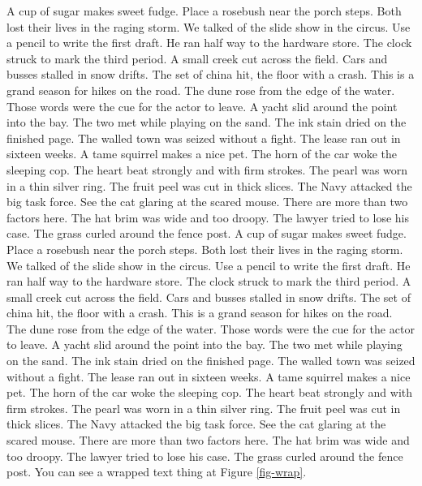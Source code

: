 \documentclass[
  letterpaper,
  DIV=11,
  numbers=noendperiod]{scrartcl}
\begin{document}
A cup of sugar makes sweet fudge. Place a rosebush near the porch steps.
Both lost their lives in the raging storm. We talked of the slide show
in the circus. Use a pencil to write the first draft. He ran half way to
the hardware store. The clock struck to mark the third period. A small
creek cut across the field. Cars and busses stalled in snow drifts. The
set of china hit, the floor with a crash. This is a grand season for
hikes on the road. The dune rose from the edge of the water. Those words
were the cue for the actor to leave. A yacht slid around the point into
the bay. The two met while playing on the sand. The ink stain dried on
the finished page. The walled town was seized without a fight. The lease
ran out in sixteen weeks. A tame squirrel makes a nice pet. The horn of
the car woke the sleeping cop. The heart beat strongly and with firm
strokes. The pearl was worn in a thin silver ring. The fruit peel was
cut in thick slices. The Navy attacked the big task force. See the cat
glaring at the scared mouse. There are more than two factors here. The
hat brim was wide and too droopy. The lawyer tried to lose his case. The
grass curled around the fence post. A cup of sugar makes sweet fudge.
Place a rosebush near the porch steps. Both lost their lives in the
raging storm. We talked of the slide show in the circus. Use a pencil to
write the first draft. He ran half way to the hardware store. The clock
struck to mark the third period. A small creek cut across the field.
Cars and busses stalled in snow drifts. The set of china hit, the floor
with a crash. This is a grand season for hikes on the road. The dune
rose from the edge of the water. Those words were the cue for the actor
to leave. A yacht slid around the point into the bay. The two met while
playing on the sand. The ink stain dried on the finished page. The
walled town was seized without a fight. The lease ran out in sixteen
weeks. A tame squirrel makes a nice pet. The horn of the car woke the
sleeping cop. The heart beat strongly and with firm strokes. The pearl
was worn in a thin silver ring. The fruit peel was cut in thick slices.
The Navy attacked the big task force. See the cat glaring at the scared
mouse. There are more than two factors here. The hat brim was wide and
too droopy. The lawyer tried to lose his case. The grass curled around
the fence post. You can see a wrapped text thing at Figure
\ref{fig-wrap}.
\end{document}
